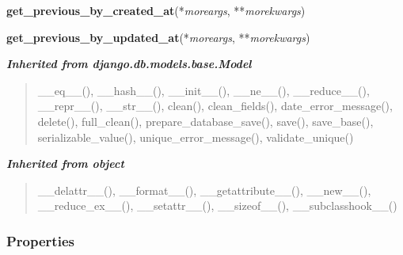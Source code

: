 \hspace{.8\funcindent}\begin{boxedminipage}{\funcwidth}

    \raggedright \textbf{get\_previous\_by\_created\_at}(*\textit{moreargs}, **\textit{morekwargs})

\setlength{\parskip}{2ex}
\setlength{\parskip}{1ex}
    \end{boxedminipage}

    \label{spatio_main:models:State:get_previous_by_updated_at}

    \vspace{0.5ex}

\hspace{.8\funcindent}\begin{boxedminipage}{\funcwidth}

    \raggedright \textbf{get\_previous\_by\_updated\_at}(*\textit{moreargs}, **\textit{morekwargs})

\setlength{\parskip}{2ex}
\setlength{\parskip}{1ex}
    \end{boxedminipage}


\large{\textbf{\textit{Inherited from django.db.models.base.Model}}}

\begin{quote}
\_\_eq\_\_(), \_\_hash\_\_(), \_\_init\_\_(), \_\_ne\_\_(), \_\_reduce\_\_(), \_\_repr\_\_(), \_\_str\_\_(), clean(), clean\_fields(), date\_error\_message(), delete(), full\_clean(), prepare\_database\_save(), save(), save\_base(), serializable\_value(), unique\_error\_message(), validate\_unique()
\end{quote}

\large{\textbf{\textit{Inherited from object}}}

\begin{quote}
\_\_delattr\_\_(), \_\_format\_\_(), \_\_getattribute\_\_(), \_\_new\_\_(), \_\_reduce\_ex\_\_(), \_\_setattr\_\_(), \_\_sizeof\_\_(), \_\_subclasshook\_\_()
\end{quote}


  \subsubsection{Properties}

